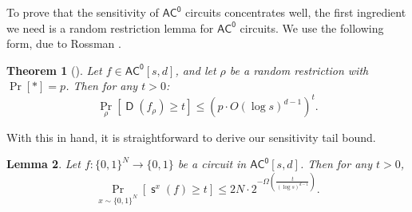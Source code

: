 \documentclass[11pt]{article}%
\newtheorem{theorem}{Theorem}
\newtheorem{lemma}[theorem]{Lemma}
\DeclareMathOperator{\D}{\mathsf{D}}
\DeclareMathOperator{\s}{\mathsf{s}}
\begin{document}
To prove that the sensitivity of $\mathsf{AC^0}$ circuits concentrates well, the first ingredient we need is a random restriction lemma for $\mathsf{AC^0}$ circuits. We use the following form, due to Rossman \cite{Ros17}.

\begin{theorem}[{\cite{Ros17}}]
\label{thm:rossman_ac0_restriction}
Let $f \in \mathsf{AC^0}[s, d]$, and let $\rho$ be a random restriction with $\Pr[*] = p$. Then for any $t > 0$:
\[
\Pr_\rho\left[\D(f_\rho) \ge t \right] \le \left(p \cdot O\left(\log s\right)^{d-1}\right)^t.
\]
\end{theorem}

With this in hand, it is straightforward to derive our sensitivity tail bound.

\begin{lemma}
\label{lem:ac0_sensitivity_tail_bound}
Let $f: \{0,1\}^N \to \{0,1\}$ be a circuit in $\mathsf{AC^0}[s, d]$. Then for any $t > 0$,
\[
\Pr_{x \sim \{0,1\}^N} \left[ \s^x(f) \ge t \right] \le 2N\cdot 2^{-\Omega\left(\frac{t}{(\log s)^{d-1}}\right)}.
\]
\end{lemma}
\end{document}
